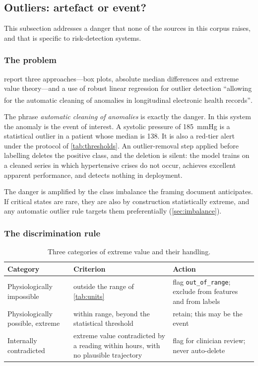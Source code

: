 \documentclass[12pt,a4paper,oneside]{report}
\newcommand{\bq}[1]{``#1''\textsuperscript{\dag}}
\begin{document}
\subsection{Outliers: artefact or event?}\label{sec:outliers}

This subsection addresses a danger that none of the sources in this corpus raises, and that is specific to risk-detection systems.

\subsubsection{The problem}

\Textcite{liu2025review} report three approaches---box plots, absolute median differences and extreme value theory---and a use of robust linear regression for outlier detection \bq{allowing for the automatic cleaning of anomalies in longitudinal electronic health records}.

The phrase \emph{automatic cleaning of anomalies} is exactly the danger. In this system the anomaly is the event of interest. A systolic pressure of 185~mmHg is a statistical outlier in a patient whose median is 138. It is also a red-tier alert under the protocol of \cref{tab:thresholds}. An outlier-removal step applied before labelling deletes the positive class, and the deletion is silent: the model trains on a cleaned series in which hypertensive crises do not occur, achieves excellent apparent performance, and detects nothing in deployment.

The danger is amplified by the class imbalance the framing document anticipates. If critical states are rare, they are also by construction statistically extreme, and any automatic outlier rule targets them preferentially (\cref{sec:imbalance}).

\subsubsection{The discrimination rule}

\begin{table}[htbp]
\centering\footnotesize
\caption{Three categories of extreme value and their handling.}\label{tab:outlier-categories}
\begin{tabularx}{\textwidth}{@{}>{\raggedright\arraybackslash}p{3.4cm} X >{\raggedright\arraybackslash}p{4.2cm}@{}}
\toprule
\textbf{Category} & \textbf{Criterion} & \textbf{Action} \\
\midrule
Physiologically impossible & outside the range of \cref{tab:units} & flag \texttt{out\_of\_range}; exclude from features and from labels \\
Physiologically possible, extreme & within range, beyond the statistical threshold & retain; this may be the event \\
Internally contradicted & extreme value contradicted by a reading within hours, with no plausible trajectory & flag for clinician review; never auto-delete \\
\bottomrule
\end{tabularx}
\end{table}
\end{document}
